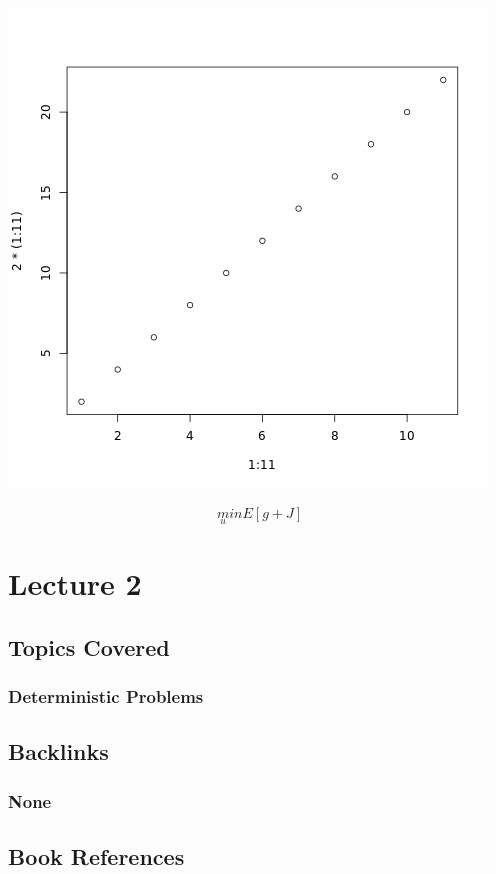 \documentclass[11pt]{article}
\begin{document}
\begin{center}
\includegraphics[width=.9\linewidth]{basic.png}
\end{center}


$$\underset{u}min E[g+J]$$


\section*{Lecture 2}
\label{sec:orgd01a0f6}
\subsection*{Topics Covered}
\label{sec:org9a5b3fc}
\subsubsection*{Deterministic Problems}
\label{sec:orgb5122a2}
\subsection*{Backlinks}
\label{sec:org2492950}
\subsubsection*{None}
\label{sec:orga78f15b}
\subsection*{Book References}
\label{sec:org5ade61e}
\end{document}
